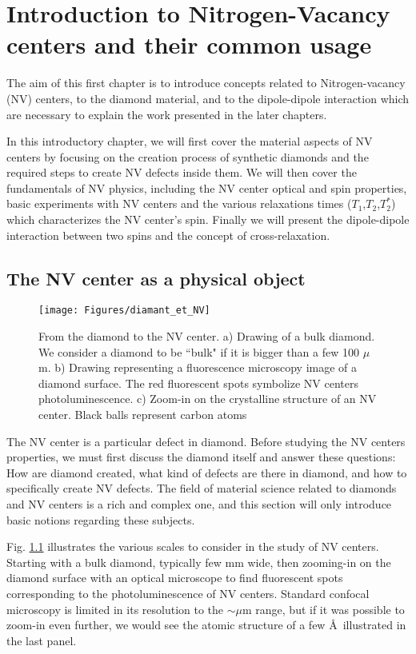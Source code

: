 \documentclass[a4paper,11pt]{report}
\title{}
\begin{document}
\chapter{Introduction to Nitrogen-Vacancy centers and their common usage}
The aim of this first chapter is to introduce concepts related to Nitrogen-vacancy (NV) centers, to the diamond material, and to the dipole-dipole interaction which are necessary to explain the work presented in the later chapters.

In this introductory chapter, we will first cover the material aspects of NV centers by focusing on the creation process of synthetic diamonds and the required steps to create NV defects inside them. We will then cover the fundamentals of NV physics, including the NV center optical and spin properties, basic experiments with NV centers and the various relaxations times ($T_1$,$T_2$,$T_2^*$) which characterizes the NV center's spin. Finally we will present the dipole-dipole interaction between two spins and the concept of cross-relaxation.

\section{The NV center as a physical object}
\begin{figure}[h!]
\centering
\texttt{[image: Figures/diamant\_et\_NV]}
\caption{From the diamond to the NV center. a) Drawing of a bulk diamond. We consider a diamond to be ``bulk" if it is bigger than a few 100 $\mu$m. b) Drawing representing a fluorescence microscopy image of a diamond surface. The red fluorescent spots symbolize NV centers photoluminescence. c) Zoom-in on the crystalline structure of an NV center. Black balls represent carbon atoms}
\label{diamond+NV}
\end{figure}
The NV center is a particular defect in diamond. Before studying the NV centers properties, we must first discuss the diamond itself and answer these questions: How are diamond created, what kind of defects are there in diamond, and how to specifically create NV defects. The field of material science related to diamonds and NV centers is a rich and complex one, and this section will only introduce basic notions regarding these subjects.

Fig. \ref{diamond+NV} illustrates the various scales to consider in the study of NV centers. Starting with a bulk diamond, typically few mm wide, then zooming-in on the diamond surface with an optical microscope to find fluorescent spots corresponding to the photoluminescence of NV centers. Standard confocal microscopy is limited in its resolution to the $\sim \mu$m range, but if it was possible to zoom-in even further, we would see the atomic structure of a few \AA \ illustrated in the last panel. 
\end{document}
